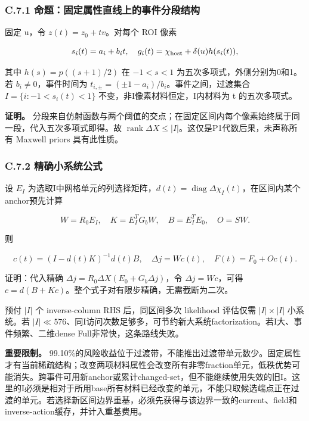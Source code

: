 \documentclass[
  11pt,
  a4paper,
]{article}
\begin{document}
\hypertarget{c.7.1-ux547dux9898ux56faux5b9aux5c5eux6027ux76f4ux7ebfux4e0aux7684ux4e8bux4ef6ux5206ux6bb5ux7ed3ux6784}{%
\subsubsection{C.7.1
命题：固定属性直线上的事件分段结构}\label{c.7.1-ux547dux9898ux56faux5b9aux5c5eux6027ux76f4ux7ebfux4e0aux7684ux4e8bux4ef6ux5206ux6bb5ux7ed3ux6784}}

固定 u，令 \(z(t)=z_0+tv\)。对每个 ROI 像素

\[
s_i(t)=a_i+b_it,\quad g_i(t)=\chi_{\rm host}+\delta(u)h(s_i(t)),
\]

其中 \(h(s)=p((s+1)/2)\) 在 \(-1<s<1\) 为五次多项式，外侧分别为0和1。若
\(b_i\ne0\)，事件时间为 \(t_{i,\pm}=(\pm1-a_i)/b_i\)。事件之间，过渡集合
\(I=\{i:-1<s_i(t)<1\}\) 不变，非I像素材料恒定，I内材料为 t
的五次多项式。

\textbf{证明。}
分段来自仿射函数与两个阈值的交点；在固定区间内每个像素始终属于同一段，代入五次多项式即得。故
\(\operatorname{rank}\Delta X\le|I|\)。这仅是P1代数后果，未声称所有
Maxwell priors 具有此性质。

\hypertarget{c.7.2-ux7cbeux786eux5c0fux7cfbux7edfux516cux5f0f}{%
\subsubsection{C.7.2
精确小系统公式}\label{c.7.2-ux7cbeux786eux5c0fux7cfbux7edfux516cux5f0f}}

设 \(E_I\)
为选取I中网格单元的列选择矩阵，\(d(t)=\operatorname{diag}\Delta\chi_I(t)\)，在区间内某个anchor预先计算

\[
W=R_0E_I,\quad K=E_I^TG_bW,\quad B=E_I^TE_0,\quad O=SW.
\]

则

\[
\boxed{\quad c(t)=(I-d(t)K)^{-1}d(t)B,\quad
\Delta j=Wc(t),\quad F(t)=F_0+Oc(t).\quad}
\]

证明：代入精确 \(\Delta j=R_0\Delta X(E_0+G_b\Delta j)\)，令
\(\Delta j=Wc\)，可得
\(c=d(B+Kc)\)。整个式子对有限步精确，无需截断为二次。

预付 \(|I|\) 个 inverse-column RHS 后，同区间多次 likelihood 评估仅需
\(|I|\times|I|\) 小系统。若
\(|I|\ll576\)、同I访问次数足够多，可节约新大系统factorization。若I大、事件频繁、二维dense
Full非常快，这条路线失败。

\textbf{重要限制。}
99.10\%的风险收益位于过渡带，不能推出过渡带单元数少。固定属性才有当前稀疏结构；改变两项材料属性会改变所有非零fraction单元，低秩优势可能消失。跨事件可用新anchor或累计changed-set，但不能继续使用失效的旧I。这里的I必须是相对于所用base所有材料已经改变的单元，不能只取候选端点正在过渡的单元。若选择新区间边界重基，必须先获得与该边界一致的current、field和inverse-action缓存，并计入重基费用。
\end{document}

